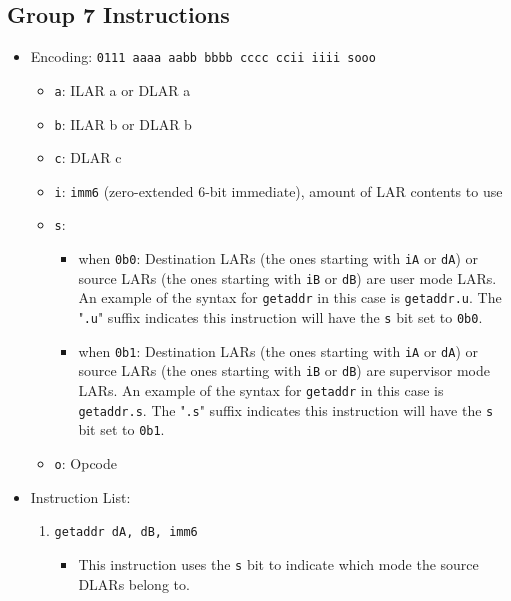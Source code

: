 \documentclass{article}
\begin{document}
	\subsection{Group 7 Instructions}
		\begin{itemize}
		\item Encoding:  \texttt{0111 aaaa aabb bbbb  cccc ccii iiii sooo}
			\begin{itemize}
			\item \texttt{a}:  ILAR a or DLAR a
			\item \texttt{b}:  ILAR b or DLAR b
			\item \texttt{c}:  DLAR c
			\item \texttt{i}:  \texttt{imm6} (zero-extended 6-bit
			immediate), amount of LAR contents to use
			\item \texttt{s}:
				\begin{itemize}
				\item when \texttt{0b0}:  Destination LARs (the ones
				starting with \texttt{iA} or \texttt{dA}) or source LARs
				(the ones starting with \texttt{iB} or \texttt{dB}) are
				user mode LARs.  An example of the syntax for
				\texttt{getaddr} in this case is \texttt{getaddr.u}.  The
				"\texttt{.u}" suffix indicates this instruction will have
				the \texttt{s} bit set to \texttt{0b0}.

				\item when \texttt{0b1}:  Destination LARs (the ones
				starting with \texttt{iA} or \texttt{dA}) or source LARs
				(the ones starting with \texttt{iB} or \texttt{dB}) are
				supervisor mode LARs.  An example of the syntax for
				\texttt{getaddr} in this case is \texttt{getaddr.s}.  The
				"\texttt{.s}" suffix indicates this instruction will have
				the \texttt{s} bit set to \texttt{0b1}.
				\end{itemize}
			\item \texttt{o}:  Opcode
			\end{itemize}

		\item Instruction List:
			\begin{enumerate}
			\item \texttt{getaddr dA, dB, imm6}
				\begin{itemize}
				\item This instruction uses the \texttt{s} bit to indicate
				which mode the source DLARs belong to.


\end{itemize}
\end{enumerate}
\end{itemize}
\end{document}
